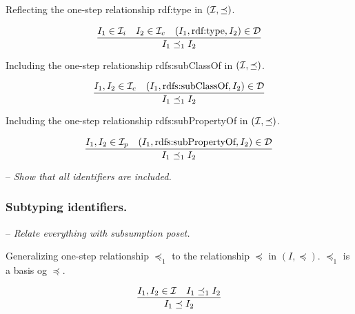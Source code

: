 \documentclass[runningheads]{llncs}
\newcommand{\D}{{\cal D}}
\newcommand{\I}{{\cal I}}
\newcommand{\Ii}{{\cal I}_i}
\newcommand{\Ic}{{\cal I}_c}
\newcommand{\Ip}{{\cal I}_p}
\newcommand{\nl}{\hfill\break}
\newcommand{\notes}[1]{\noindent\begin{small}-- \emph{#1}\\\end{small}}
\begin{document}
\noindent Reflecting the one-step relationship rdf:type in $(\I,\preceq)$. 

\begin{equation}
\dfrac{I_1\in\Ii \quad I_2\in\Ic \quad (I_1,\text{rdf:type},I_2)\in \D}
      {I_1 \preceq_1 I_2}
\end{equation}

\noindent Including the one-step relationship rdfs:subClassOf in
$(\I,\preceq)$.

\begin{equation}
\dfrac{I_1,I_2\in\Ic \quad (I_1,\text{rdfs:subClassOf},I_2)\in \D}
      {I_1 \preceq_1 I_2}
\end{equation}

\noindent Including the one-step relationship rdfs:subPropertyOf in
$(\I,\preceq)$.

\begin{equation}
\dfrac{I_1,I_2\in\Ip \quad (I_1,\text{rdfs:subPropertyOf},I_2)\in \D}
      {I_1\preceq_1\/I_2}
\end{equation}

\notes{Show that all identifiers are included.}


\subsubsection{Subtyping identifiers.}\nl

%

%
%

\notes{Relate everything with subsumption poset.}

Generalizing one-step relationship $\preceq_1$ to the relationship
$\preceq$ in $(I,\preceq)$.  $\preceq_1$ is a basis og $\preceq$.

\begin{equation}
\dfrac{I_1,I_2\in\I \quad I_1\preceq_1 I_2}
      {I_1 \preceq I_2}
\end{equation}
\end{document}
